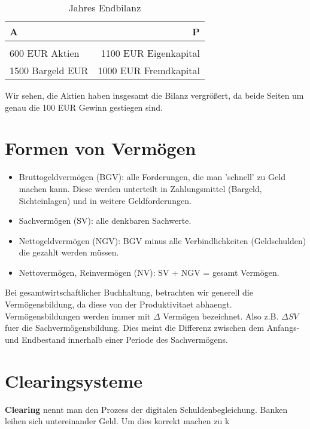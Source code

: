 \documentclass[a4paper]{article}
\begin{document}
\begin{table}
	\centering
	\caption{Jahres Endbilanz}
	\label{tab:label}
	\begin{tabular}{l|r}
		A                & P                     \\
		\hline                                   \\
		600 EUR Aktien   & 1100 EUR Eigenkapital \\
		1500 Bargeld EUR & 1000 EUR Fremdkapital \\
	\end{tabular}
\end{table}

Wir sehen, die Aktien haben insgesamt die Bilanz vergrößert, da beide Seiten
um genau die 100 EUR Gewinn gestiegen sind.

\section{
  Formen von Vermögen
 }

\begin{itemize}
	\item Bruttogeldvermögen (BGV): alle Forderungen, die man 'schnell' zu Geld machen
	      kann. Diese werden unterteilt in Zahlungsmittel
	      (Bargeld, Sichteinlagen) und in weitere Geldforderungen.

	\item Sachvermögen (SV): alle denkbaren Sachwerte.

	\item Nettogeldvermögen (NGV): BGV minus alle Verbindlichkeiten (Geldschulden)
	      die gezahlt werden müssen.

	\item Nettovermögen, Reinvermögen (NV): SV + NGV = gesamt Vermögen.
\end{itemize}

Bei gesamtwirtschaftlicher Buchhaltung, betrachten wir generell die
Vermögensbildung, da diese von der Produktivitaet abhaengt.
\\

Verm\"ogensbildungen werden immer mit $\Delta$ Verm\"ogen bezeichnet. Also
z.B. $\Delta SV$ fuer die Sachvermögensbildung. Dies meint die Differenz
zwischen dem Anfangs- und Endbestand innerhalb einer Periode des Sachvermögens.

\section{Clearingsysteme}

\textbf{Clearing} nennt man den Prozess der digitalen Schuldenbegleichung.
Banken leihen sich untereinander Geld. Um dies korrekt machen zu k
\end{document}
